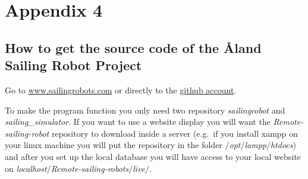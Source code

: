\documentclass[twoside,12pt]{report} %
\begin{document}
\chapter*{Appendix 4}

\section*{How to get the source code of the \r{A}land Sailing Robot Project}


Go to \href{www.sailingrobots.com}{www.sailingrobots.com} or directly to the  \href{https://github.com/AlandSailingRobots}{github account}. 

To make the program function you only need two repository \textit{sailingrobot} and \textit{sailing\_simulator}. If you want to use a website display you will want the \textit{Remote-sailing-robot} repository to download inside a server (e.g.\ if you install xampp on your linux machine you will put the repository in the folder \textit{$\slash$opt$\slash$lampp$\slash$htdocs}) and after you set up the local database you will have access to your local website on \textit{localhost$\slash$Remote-sailing-robots$\slash$live$\slash$}.

%


\nocite{*}


\end{document}
